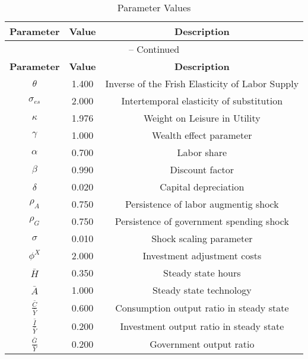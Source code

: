 \begin{center}
\begin{longtable}{ccc}
\caption{Parameter Values}\\%
\toprule%
\multicolumn{1}{c}{\textbf{Parameter}} &
\multicolumn{1}{c}{\textbf{Value}} &
 \multicolumn{1}{c}{\textbf{Description}}\\%
\midrule%
\endfirsthead
\multicolumn{3}{c}{{\tablename} \thetable{} -- Continued}\\%
\midrule%
\multicolumn{1}{c}{\textbf{Parameter}} &
\multicolumn{1}{c}{\textbf{Value}} &
  \multicolumn{1}{c}{\textbf{Description}}\\%
\midrule%
\endhead
${\theta}$ 	 & 	 1.400 	 & 	 Inverse of the Frish Elasticity of Labor Supply\\
${\sigma_{es}}$ 	 & 	 2.000 	 & 	 Intertemporal elasticity of substitution\\
${\kappa}$ 	 & 	 1.976 	 & 	 Weight on Leisure in Utility\\
${\gamma}$ 	 & 	 1.000 	 & 	 Wealth effect parameter\\
${\alpha}$ 	 & 	 0.700 	 & 	 Labor share\\
${\beta}$ 	 & 	 0.990 	 & 	 Discount factor\\
${\delta}$ 	 & 	 0.020 	 & 	 Capital depreciation\\
${\rho_{A}}$ 	 & 	 0.750 	 & 	 Persistence of labor augmentig shock\\
${\rho_{G}}$ 	 & 	 0.750 	 & 	 Persistence of government spending shock\\
${\sigma}$ 	 & 	 0.010 	 & 	 Shock scaling parameter\\
${\phi^X}$ 	 & 	 2.000 	 & 	 Investment adjustment costs\\
$\bar{H}$ 	 & 	 0.350 	 & 	 Steady state hours\\
$\bar{A}$ 	 & 	 1.000 	 & 	 Steady state technology\\
$\frac{\bar{C}}{\bar{Y}}$ 	 & 	 0.600 	 & 	 Consumption output ratio in steady state\\
$\frac{\bar{I}}{\bar{Y}}$ 	 & 	 0.200 	 & 	 Investment output ratio in steady state\\
$\frac{\bar{G}}{\bar{Y}}$ 	 & 	 0.200 	 & 	 Government output ratio\\
\bottomrule%
\end{longtable}
\end{center}

